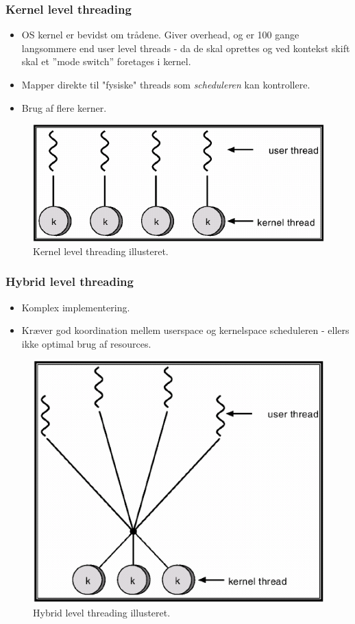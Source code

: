 \subsubsection{Kernel level threading}
\begin{itemize}
	\item OS kernel er bevidst om trådene. Giver overhead, og er 100 gange langsommere end user level threads - da de skal oprettes og ved kontekst skift skal et ''mode switch'' foretages i kernel.
	\item Mapper direkte til "fysiske" threads som \textit{scheduleren} kan kontrollere.
	\item Brug af flere kerner.
\end{itemize}

\begin{figure}[H]
	\centering
	\includegraphics[width=0.5\linewidth]{figs/spm1/kernelthreads}
	\caption{Kernel level threading illusteret.}
	\label{fig:kernelthreads}
\end{figure}

\subsubsection{Hybrid level threading}
\begin{itemize}
	\item Komplex implementering.
	\item Kræver god koordination mellem userspace og kernelspace scheduleren - ellers ikke optimal brug af resources.
\end{itemize}

\begin{figure}[H]
	\centering
	\includegraphics[width=0.5\linewidth]{figs/spm1/hybridthreads}
	\caption{Hybrid level threading illusteret.}
	\label{fig:hybridthreads}
\end{figure}

